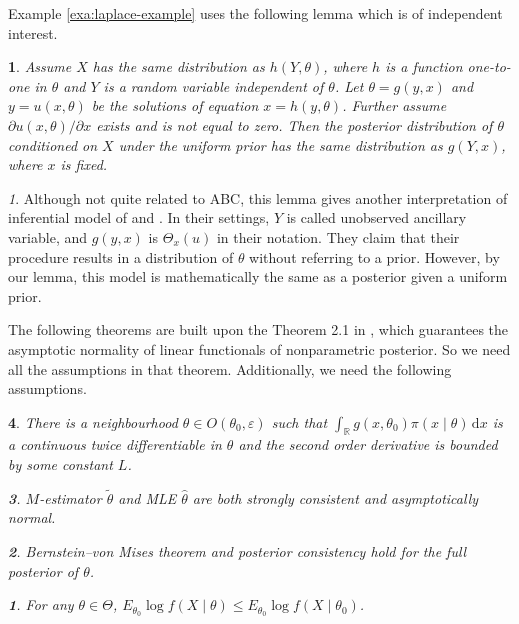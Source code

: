 \documentclass[oneside,english]{amsbook}
\numberwithin{section}{chapter}
\numberwithin{equation}{section}
\numberwithin{figure}{section}
\theoremstyle{plain}
\newtheorem{lem}{\protect\lemmaname}
\theoremstyle{plain}
\newtheorem{assumption}{\protect\assumptionname}
\theoremstyle{definition}
\theoremstyle{plain}
\theoremstyle{plain}
\theoremstyle{remark}
\newtheorem{rem}{\protect\remarkname}
\theoremstyle{definition}
\theoremstyle{definition}
\newcommand{\diff}{\,\mathrm{d}}
\providecommand{\assumptionname}{Assumption}
\providecommand{\lemmaname}{Lemma}
\providecommand{\remarkname}{Remark}
\begin{document}
Example \ref{exa:laplace-example} uses the following lemma which
is of independent interest. 
\begin{lem}
\label{lem:bayes-inferential-model}Assume $X$ has the same distribution
as $h\left(Y,\theta\right)$, where $h$ is a function one-to-one
in $\theta$ and $Y$ is a random variable independent of $\theta$.
Let $\theta=g\left(y,x\right)$ and $y=u\left(x,\theta\right)$ be
the solutions of equation $x=h\left(y,\theta\right)$. Further assume
$\partial u\left(x,\theta\right)/\partial x$ exists and is not equal
to zero. Then the posterior distribution of $\theta$ conditioned
on $X$ under the uniform prior has the same distribution as $g\left(Y,x\right)$,
where $x$ is fixed. \end{lem}
\begin{rem}
Although not quite related to ABC, this lemma gives another interpretation
of inferential model of \citet{martin2013inferential} and \citet{martin2015conditional}.
In their settings, $Y$ is called unobserved ancillary variable, and
$g\left(y,x\right)$ is $\Theta_{x}\left(u\right)$ in their notation.
They claim that their procedure results in a distribution of $\theta$
without referring to a prior. However, by our lemma, this model is
mathematically the same as a posterior given a uniform prior.
\end{rem}
The following theorems are built upon the Theorem 2.1 in \citet{rivoirard2012bernstein},
which guarantees the asymptotic normality of linear functionals of
nonparametric posterior. So we need all the assumptions in that theorem.
Additionally, we need the following assumptions. 
\begin{assumption}
\label{assu:second-order-bounded-differential}There is a neighbourhood
$\theta\in O\left(\theta_{0},\varepsilon\right)$ such that $\int_{\mathbb{R}}g\left(x,\theta_{0}\right)\pi\left(x\mid\theta\right)\diff x$
is a continuous twice differentiable in $\theta$ and the second order
derivative is bounded by some constant $L$. 
\begin{assumption}
\label{assu:m-est-consistent-asymp-norml}$M$-estimator $\tilde{\theta}$
and MLE $\hat{\theta}$ are both strongly consistent and asymptotically
normal.
\begin{assumption}
\label{assu:bernstein-von-mises-full-posterior} Bernstein--von Mises
theorem and posterior consistency hold for the full posterior of $\theta$.
\begin{assumption}
\label{assu:theo-mle}For any $\theta\in\Theta$, $E_{\theta_{0}}\log f\left(X\mid\theta\right)\le E_{\theta_{0}}\log f\left(X\mid\theta_{0}\right)$. 
\end{assumption}
\end{assumption}
\end{assumption}
\end{assumption}
\end{document}
